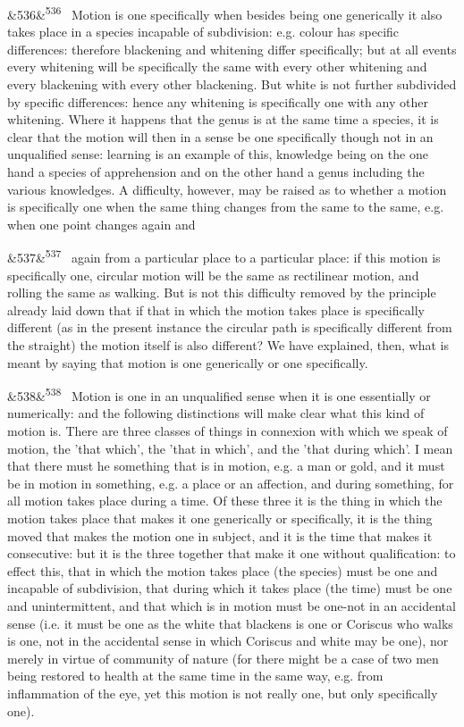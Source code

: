 \documentclass[12pt]{article}
\newcommand{\para}[1][]{\par\noindent\ifx&#1&\else\textsuperscript{\footnotesize #1}~\fi}
\begin{document}
\para[536] Motion is one specifically when besides being one generically it also takes place in a species incapable of subdivision: e.g. colour has specific differences: therefore blackening and whitening differ specifically; but at all events every whitening will be specifically the same with every other whitening and every blackening with every other blackening. But white is not further subdivided by specific differences: hence any whitening is specifically one with any other whitening. Where it happens that the genus is at the same time a species, it is clear that the motion will then in a sense be one specifically though not in an unqualified sense: learning is an example of this, knowledge being on the one hand a species of apprehension and on the other hand a genus including the various knowledges. A difficulty, however, may be raised as to whether a motion is specifically one when the same thing changes from the same to the same, e.g. when one point changes again and

\para[537] again from a particular place to a particular place: if this motion is specifically one, circular motion will be the same as rectilinear motion, and rolling the same as walking. But is not this difficulty removed by the principle already laid down that if that in which the motion takes place is specifically different (as in the present instance the circular path is specifically different from the straight) the motion itself is also different? We have explained, then, what is meant by saying that motion is one generically or one specifically.

\para[538] Motion is one in an unqualified sense when it is one essentially or numerically: and the following distinctions will make clear what this kind of motion is. There are three classes of things in connexion with which we speak of motion, the 'that which’, the 'that in which’, and the 'that during which’. I mean that there must he something that is in motion, e.g. a man or gold, and it must be in motion in something, e.g. a place or an affection, and during something, for all motion takes place during a time. Of these three it is the thing in which the motion takes place that makes it one generically or specifically, it is the thing moved that makes the motion one in subject, and it is the time that makes it consecutive: but it is the three together that make it one without qualification: to effect this, that in which the motion takes place (the species) must be one and incapable of subdivision, that during which it takes place (the time) must be one and unintermittent, and that which is in motion must be one-not in an accidental sense (i.e. it must be one as the white that blackens is one or Coriscus who walks is one, not in the accidental sense in which Coriscus and white may be one), nor merely in virtue of community of nature (for there might be a case of two men being restored to health at the same time in the same way, e.g. from inflammation of the eye, yet this motion is not really one, but only specifically one).
\end{document}
